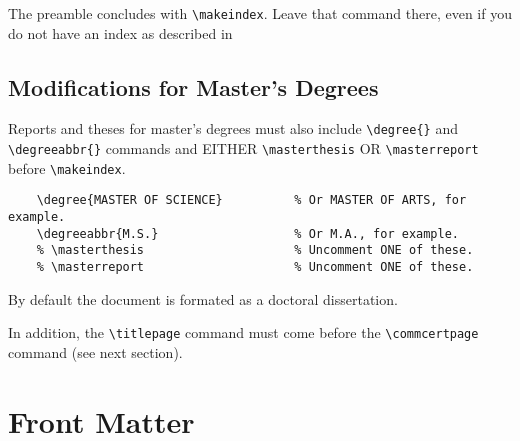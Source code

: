 The preamble concludes with \verb+\makeindex+.
Leave that command there, even if you do not have an index as described in 

\subsection{Modifications for Master's Degrees} %

Reports and theses for master's degrees must also include \verb+\degree{}+ and \verb+\degreeabbr{}+ commands and EITHER \verb+\masterthesis+ OR \verb+\masterreport+ before \verb+\makeindex+.
\begin{verbatim}
    \degree{MASTER OF SCIENCE}          % Or MASTER OF ARTS, for example.
    \degreeabbr{M.S.}                   % Or M.A., for example.
    % \masterthesis                     % Uncomment ONE of these.
    % \masterreport                     % Uncomment ONE of these.
\end{verbatim}
By default the document is formated as a doctoral dissertation.

In addition, the \verb+\titlepage+ command must come before the \verb+\commcertpage+ command (see next section).

\section{Front Matter} %

